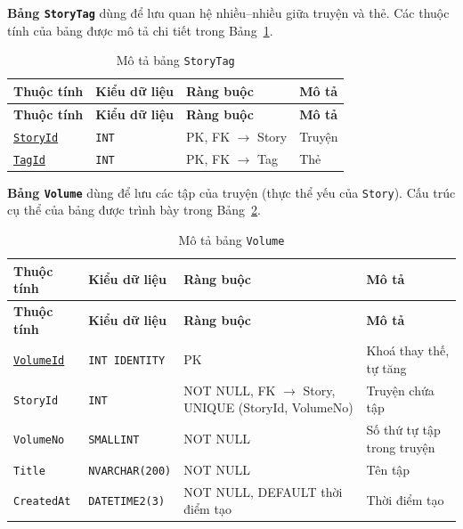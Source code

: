 \textbf{Bảng \texttt{StoryTag}} dùng để lưu quan hệ nhiều--nhiều giữa truyện và thẻ. Các thuộc tính của bảng được mô tả chi tiết trong Bảng~\ref{tab:db-story-tag}.


{\small
\renewcommand{\arraystretch}{1.2}
\begin{longtable}{|>{\raggedright\arraybackslash}p{3.1cm}|>{\raggedright\arraybackslash}p{2.7cm}|>{\raggedright\arraybackslash}p{4.0cm}|>{\raggedright\arraybackslash}p{5.4cm}|}
\caption{Mô tả bảng \texttt{StoryTag}}\label{tab:db-story-tag}\\
\hline
\textbf{Thuộc tính} & \textbf{Kiểu dữ liệu} & \textbf{Ràng buộc} & \textbf{Mô tả} \\ \hline
\endfirsthead
\hline
\textbf{Thuộc tính} & \textbf{Kiểu dữ liệu} & \textbf{Ràng buộc} & \textbf{Mô tả} \\ \hline
\endhead
\underline{\texttt{StoryId}} & \texttt{INT} & PK, FK $\rightarrow$ Story & Truyện \\ \hline
\underline{\texttt{TagId}} & \texttt{INT} & PK, FK $\rightarrow$ Tag & Thẻ \\ \hline
\end{longtable}
}

\textbf{Bảng \texttt{Volume}} dùng để lưu các tập của truyện (thực thể yếu của \texttt{Story}). Cấu trúc cụ thể của bảng được trình bày trong Bảng~\ref{tab:db-volume}.


{\small
\renewcommand{\arraystretch}{1.2}
\begin{longtable}{|>{\raggedright\arraybackslash}p{3.1cm}|>{\raggedright\arraybackslash}p{2.7cm}|>{\raggedright\arraybackslash}p{4.0cm}|>{\raggedright\arraybackslash}p{5.4cm}|}
\caption{Mô tả bảng \texttt{Volume}}\label{tab:db-volume}\\
\hline
\textbf{Thuộc tính} & \textbf{Kiểu dữ liệu} & \textbf{Ràng buộc} & \textbf{Mô tả} \\ \hline
\endfirsthead
\hline
\textbf{Thuộc tính} & \textbf{Kiểu dữ liệu} & \textbf{Ràng buộc} & \textbf{Mô tả} \\ \hline
\endhead
\underline{\texttt{VolumeId}} & \texttt{INT IDENTITY} & PK & Khoá thay thế, tự tăng \\ \hline
\texttt{StoryId} & \texttt{INT} & NOT NULL, FK $\rightarrow$ Story, UNIQUE (StoryId, VolumeNo) & Truyện chứa tập \\ \hline
\texttt{VolumeNo} & \texttt{SMALLINT} & NOT NULL & Số thứ tự tập trong truyện \\ \hline
\texttt{Title} & \texttt{NVARCHAR(200)} & NOT NULL & Tên tập \\ \hline
\texttt{CreatedAt} & \texttt{DATETIME2(3)} & NOT NULL, DEFAULT thời điểm tạo & Thời điểm tạo \\ \hline
\end{longtable}
}

